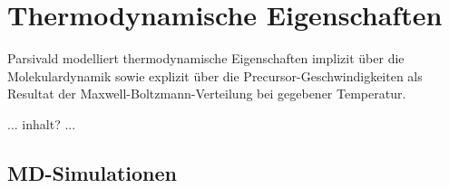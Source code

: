 \section{Thermodynamische Eigenschaften}

Parsivald modelliert thermodynamische Eigenschaften implizit über die Molekulardynamik sowie explizit über die Precursor-Geschwindigkeiten als Resultat der Maxwell-Boltzmann-Verteilung bei gegebener Temperatur.

... inhalt? ...

\subsection{MD-Simulationen}
